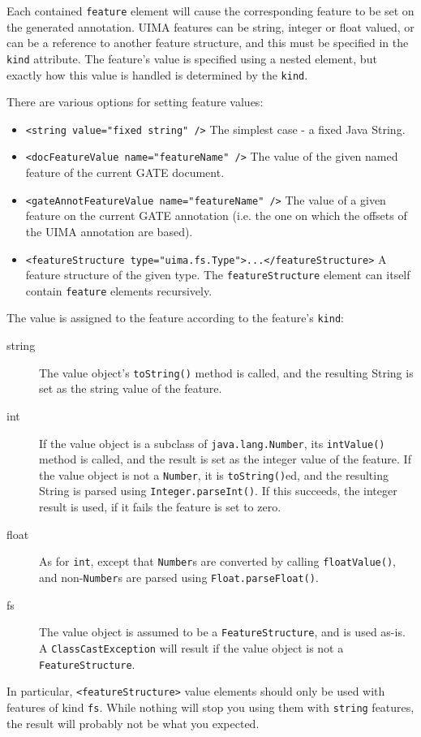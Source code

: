 Each contained \texttt{feature} element will cause the corresponding feature to
be set on the generated annotation.  UIMA features can be string, integer or
float valued, or can be a reference to another feature structure, and this must
be specified in the \texttt{kind} attribute.  The feature's value is specified
using a nested element, but exactly how this value is handled is determined by
the \texttt{kind}.

There are various options for setting feature values:
\begin{itemize}
\item \verb|<string value="fixed string" />| The simplest case - a fixed Java
String.
\item \verb|<docFeatureValue name="featureName" />| The value of the given
named feature of the current GATE document.
\item \verb|<gateAnnotFeatureValue name="featureName" />| The value of a given
feature on the current GATE annotation (i.e. the one on which the offsets of
the UIMA annotation are based).
\item \verb|<featureStructure type="uima.fs.Type">...</featureStructure>| A
feature structure of the given type.  The \texttt{featureStructure} element can
itself contain \texttt{feature} elements recursively.
\end{itemize}

The value is assigned to the feature according to the feature's \texttt{kind}:
\begin{description}
\item[string] The value object's \texttt{toString()} method is called,
and the resulting String is set as the string value of the feature.
\item[int] If the value object is a subclass of
\texttt{java.lang.Number}, its \texttt{intValue()} method is called, and the
result is set as the integer value of the feature.  If the value object is not
a \texttt{Number}, it is \texttt{toString()}ed, and the resulting String is
parsed using \texttt{Integer.parseInt()}.  If this succeeds, the integer result
is used, if it fails the feature is set to zero.
\item[float] As for \texttt{int}, except that \texttt{Number}s are
converted by calling \texttt{floatValue()}, and non-\texttt{Number}s are parsed
using \texttt{Float.parseFloat()}.
\item[fs] The value object is assumed to be a \texttt{FeatureStructure}, and is
used as-is.  A \texttt{ClassCastException} will result if the value object is
not a \texttt{FeatureStructure}.
\end{description}
%
In particular, \verb|<featureStructure>| value elements should only be used
with features of kind \texttt{fs}.  While nothing will stop you using them with
\texttt{string} features, the result will probably not be what you expected.

